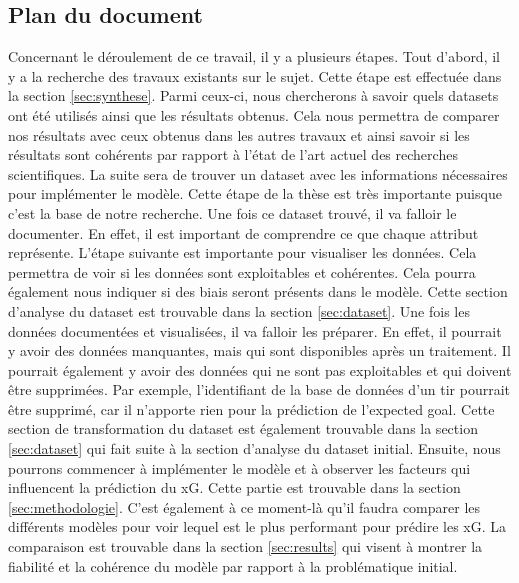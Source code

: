 \documentclass[12pt]{article}
\begin{document}
\subsection{Plan du document}
Concernant le déroulement de ce travail, il y a plusieurs étapes.
Tout d'abord, il y a la recherche des travaux existants sur le sujet.
Cette étape est effectuée dans la section \ref{sec:synthese}.
Parmi ceux-ci, nous chercherons à savoir quels datasets ont été utilisés ainsi que les résultats obtenus.
Cela nous permettra de comparer nos résultats avec ceux obtenus dans les autres travaux et ainsi savoir si les résultats sont cohérents par rapport à l'état de l'art actuel des recherches scientifiques.
\newline \newline
La suite sera de trouver un dataset avec les informations nécessaires pour implémenter le modèle.
Cette étape de la thèse est très importante puisque c'est la base de notre recherche.
Une fois ce dataset trouvé, il va falloir le documenter. En effet, il est important de comprendre ce que chaque attribut représente.
L'étape suivante est importante pour visualiser les données.
Cela permettra de voir si les données sont exploitables et cohérentes.
Cela pourra également nous indiquer si des biais seront présents dans le modèle.
Cette section d'analyse du dataset est trouvable dans la section \ref{sec:dataset}.
\newline \newline
Une fois les données documentées et visualisées, il va falloir les préparer.
En effet, il pourrait y avoir des données manquantes, mais qui sont disponibles après un traitement.
Il pourrait également y avoir des données qui ne sont pas exploitables et qui doivent être supprimées.
Par exemple, l'identifiant de la base de données d'un tir pourrait être supprimé, car il n'apporte rien pour la prédiction de l'expected goal.
Cette section de transformation du dataset est également trouvable dans la section \ref{sec:dataset} qui fait suite à la section d'analyse du dataset initial.
\newline \newline
Ensuite, nous pourrons commencer à implémenter le modèle et à observer les facteurs qui influencent la prédiction du xG.
Cette partie est trouvable dans la section \ref{sec:methodologie}.
C'est également à ce moment-là qu'il faudra comparer les différents modèles pour voir lequel est le plus performant pour prédire les xG.
La comparaison est trouvable dans la section \ref{sec:results} qui visent à montrer la fiabilité et la cohérence du modèle par rapport à la problématique initial.
\end{document}
